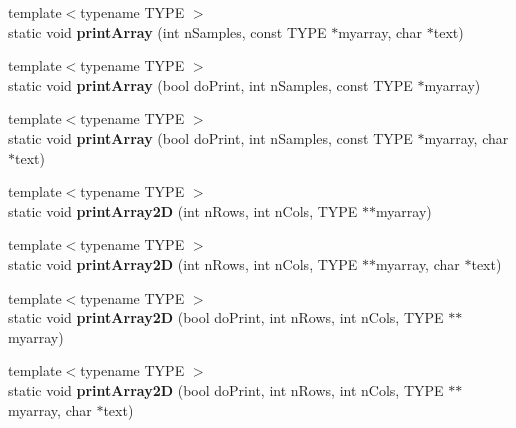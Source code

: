 \begin{DoxyCompactItemize}
\item 
\hypertarget{class_k_w_util_aa537bb86732154b9ad1317e851afccfd}{{\footnotesize template$<$typename T\-Y\-P\-E $>$ }\\static void {\bfseries print\-Array} (int n\-Samples, const T\-Y\-P\-E $\ast$myarray, char $\ast$text)}\label{class_k_w_util_aa537bb86732154b9ad1317e851afccfd}

\item 
\hypertarget{class_k_w_util_a551666cf04781258441f4d5a77c6a7d8}{{\footnotesize template$<$typename T\-Y\-P\-E $>$ }\\static void {\bfseries print\-Array} (bool do\-Print, int n\-Samples, const T\-Y\-P\-E $\ast$myarray)}\label{class_k_w_util_a551666cf04781258441f4d5a77c6a7d8}

\item 
\hypertarget{class_k_w_util_a5eafacfaa0ea74867d2b37cf22558644}{{\footnotesize template$<$typename T\-Y\-P\-E $>$ }\\static void {\bfseries print\-Array} (bool do\-Print, int n\-Samples, const T\-Y\-P\-E $\ast$myarray, char $\ast$text)}\label{class_k_w_util_a5eafacfaa0ea74867d2b37cf22558644}

\item 
\hypertarget{class_k_w_util_a0d00bcaaee4bf9fe1ea3f28c39db766d}{{\footnotesize template$<$typename T\-Y\-P\-E $>$ }\\static void {\bfseries print\-Array2\-D} (int n\-Rows, int n\-Cols, T\-Y\-P\-E $\ast$$\ast$myarray)}\label{class_k_w_util_a0d00bcaaee4bf9fe1ea3f28c39db766d}

\item 
\hypertarget{class_k_w_util_a8ca8f9d0826b637aee5285af196431a0}{{\footnotesize template$<$typename T\-Y\-P\-E $>$ }\\static void {\bfseries print\-Array2\-D} (int n\-Rows, int n\-Cols, T\-Y\-P\-E $\ast$$\ast$myarray, char $\ast$text)}\label{class_k_w_util_a8ca8f9d0826b637aee5285af196431a0}

\item 
\hypertarget{class_k_w_util_a2907060d81976090c40829107159666d}{{\footnotesize template$<$typename T\-Y\-P\-E $>$ }\\static void {\bfseries print\-Array2\-D} (bool do\-Print, int n\-Rows, int n\-Cols, T\-Y\-P\-E $\ast$$\ast$myarray)}\label{class_k_w_util_a2907060d81976090c40829107159666d}

\item 
\hypertarget{class_k_w_util_a59aabe5a32605da8367ca84c3ad3a0ab}{{\footnotesize template$<$typename T\-Y\-P\-E $>$ }\\static void {\bfseries print\-Array2\-D} (bool do\-Print, int n\-Rows, int n\-Cols, T\-Y\-P\-E $\ast$$\ast$myarray, char $\ast$text)}\label{class_k_w_util_a59aabe5a32605da8367ca84c3ad3a0ab}


\end{DoxyCompactItemize}
